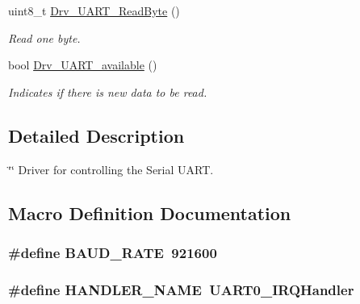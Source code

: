 \begin{DoxyCompactItemize}
uint8\+\_\+t \hyperlink{group___u_a_r_t___library_ga0332d0b4b9dee94a3464a62ab776b594}{Drv\+\_\+\+U\+A\+R\+T\+\_\+\+Read\+Byte} ()
\begin{DoxyCompactList}\small\item\em Read one byte. \end{DoxyCompactList}\item 
bool \hyperlink{group___u_a_r_t___library_ga7a96fcb2dfc23bcf106ef05a6e348eb4}{Drv\+\_\+\+U\+A\+R\+T\+\_\+available} ()
\begin{DoxyCompactList}\small\item\em Indicates if there is new data to be read. \end{DoxyCompactList}\end{DoxyCompactItemize}


\subsection{Detailed Description}
\char`\"{}\char`\"{} Driver for controlling the Serial U\+A\+R\+T. 

\subsection{Macro Definition Documentation}
\hypertarget{group___u_a_r_t___library_gad4455691936f92fdd6c37566fc58ba1f}{}
\subsubsection[{B\+A\+U\+D\+\_\+\+R\+A\+T\+E}]{\setlength{\rightskip}{0pt plus 5cm}\#define B\+A\+U\+D\+\_\+\+R\+A\+T\+E~921600}\label{group___u_a_r_t___library_gad4455691936f92fdd6c37566fc58ba1f}
\hypertarget{group___u_a_r_t___library_gafa87a27ed6f715eb90d4db80687e93bf}{}
\subsubsection[{H\+A\+N\+D\+L\+E\+R\+\_\+\+N\+A\+M\+E}]{\setlength{\rightskip}{0pt plus 5cm}\#define H\+A\+N\+D\+L\+E\+R\+\_\+\+N\+A\+M\+E~U\+A\+R\+T0\+\_\+\+I\+R\+Q\+Handler}\label{group___u_a_r_t___library_gafa87a27ed6f715eb90d4db80687e93bf}
\hypertarget{group___u_a_r_t___library_ga7c3d3b9d5cf2685f7fdb298eaf359875}{}
